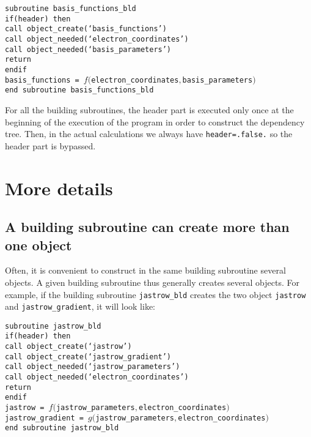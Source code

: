 \documentclass[a4paper,11pt]{article}
\begin{document}
\vspace{0.5cm}
\noindent
{\tt subroutine basis\_functions\_bld\\
if(header) then\\
\phantom{xx} call object\_create(`basis\_functions')\\
\phantom{xx} call object\_needed(`electron\_coordinates')\\
\phantom{xx} call object\_needed(`basis\_parameters')\\
\phantom{xx} return\\
endif\\
basis\_functions  = $f(${\tt electron\_coordinates}$,${\tt basis\_parameters}$)$\\
end subroutine basis\_functions\_bld}

\vspace{0.5cm}
For all the building subroutines, the header part is executed only once at the beginning of the execution of the program in order to construct the dependency tree. Then, in the actual calculations we always have {\tt header=.false.} so the header part is bypassed.

\section{More details}

\subsection{A building subroutine can create more than one object}

Often, it is convenient to construct in the same building subroutine several objects. A given building subroutine thus generally creates several objects. For example, if the building subroutine {\tt jastrow\_bld} creates the two object {\tt jastrow} and {\tt jastrow\_gradient}, it will look like:

\vspace{0.5cm}
\noindent
{\tt subroutine jastrow\_bld\\
if(header) then\\
\phantom{xx} call object\_create(`jastrow')\\
\phantom{xx} call object\_create(`jastrow\_gradient')\\
\phantom{xx} call object\_needed(`jastrow\_parameters')\\
\phantom{xx} call object\_needed(`electron\_coordinates')\\
\phantom{xx} return\\
endif\\
jastrow  = $f(${\tt jastrow\_parameters}$,${\tt electron\_coordinates}$)$\\
jastrow\_gradient  = $g(${\tt jastrow\_parameters}$,${\tt electron\_coordinates}$)$\\
end subroutine jastrow\_bld}
\end{document}
